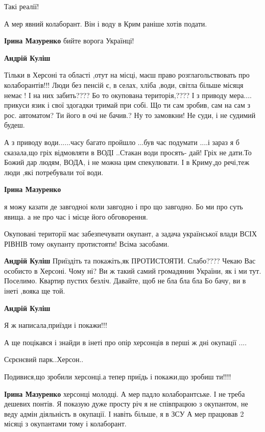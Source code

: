 \begin{itemize}
\begin{itemize}
Такі реалії!

А мер явний колаборант. Він і воду в Крим раніше хотів подати.

\textbf{Ірина Мазуренко} бийте ворога Українці!

\textbf{Андрій Куліш} 

Тільки в Херсоні та області ,отут на місці, маєш право розглагольствовать про
колаборантів!!! Люди без пенсій є, в селах, хліба ,води, світла більше місяця
немає ! І на них забить???? Бо то окупована територія,???? І з приводу
мера.... прикуси язик і свої здогадки тримай при собі. Що ти сам зробив, сам на
сам з рос. автоматом? Ти його в очі не бачив.? Ну то замовкни! Не суди, і не
судимий будеш.


А з приводу води......часу багато пройшло ...був час подумати ....і зараз я б
сказала,що гріх відмовляти в ВОДІ ..Стакан води просять- дай! Гріх не дати.То
Божий дар людям, ВОДА, і не можна цим спекулювати.  І в Криму,до речі,теж люди
,які потребували тої води.

\textbf{Ірина Мазуренко} 

я можу казати де завгодноі коли завгодно і про що завгодно. Бо ми про суть
явища. а не про час і місце його обговорення.

Окуповані території має забезпечувати окупант, а задача української влади ВСІХ
РІВНІВ тому окупанту протистояти! Всіма засобами.

\textbf{Андрій Куліш} Приїздіть та покажіть,як ПРОТИСТОЯТИ.
Слабо????
Чекаю Вас особисто в Херсоні.
Чому ні?
Ви ж такий самий громадянин України, як і ми тут.
Поселимо. Квартир пустих безліч.
Давайте, щоб не бла бла бла
Бо бачу, ви в інеті ,вояка ще той.

\textbf{Андрій Куліш} 

Я ж написала,приїзди і покажи!!!

А ще поцікався і знайди в інеті про опір херсонців в перші ж дні окупації ....

Сєрєнєвий парк..Херсон..

Подивися,що зробили херсонці.а тепер приїдь і покажи,що зробиш ти!!!!

\textbf{Ірина Мазуренко} херсонці молодці. А мер падло колаборантське.
І не треба дешевих понтів.
Я показую дуже просту річ я не співпрацюю з окупантом, не веду адмін діяльність в окупації.
І навіть більше, я в ЗСУ
А мер працював 2 місяці з окупантами тому і колаборант.


\end{itemize}
\end{itemize}
